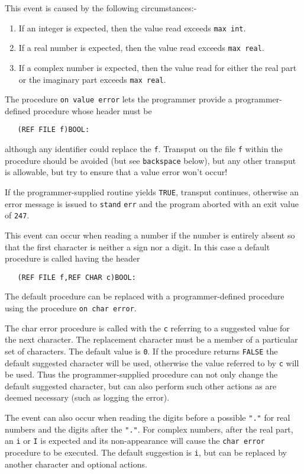 This event is caused by the following circumstances:-
\begin{enumerate}
\item If an integer is expected, then the value read exceeds
\verb|max int|.
\item If a real number is expected, then the value read exceeds
\verb|max real|.
\item If a complex number is expected, then the value read for either
the real part or the imaginary part exceeds \verb|max real|.
\end{enumerate}
The procedure \verb|on value error| lets the programmer provide
a programmer-defined procedure whose header must be
\begin{verbatim}
   (REF FILE f)BOOL:
\end{verbatim}
\noindent
although any identifier could replace the \verb|f|. Transput on the
file \verb|f| within the procedure should be avoided (but see
\verb|backspace| below), but any other transput is allowable, but try
to ensure that a value error won't occur!

If the programmer-supplied routine yields \verb|TRUE|, transput
continues, otherwise an error message is issued to \verb|stand|
\verb|err| and the program aborted with an exit value of \verb|247|.

This event can occur when reading a number if the number is entirely
absent so that the first character is neither a sign nor a digit. In
this case a default procedure is called having the header
\begin{verbatim}
   (REF FILE f,REF CHAR c)BOOL:
\end{verbatim}
\noindent
The default procedure can be replaced with a programmer-defined
procedure using the procedure \verb|on char error|.

The char error procedure is called with the \verb|c| referring to a
suggested value for the next character. The replacement character
must be a member of a particular set of characters. The default value
is \verb|0|. If the procedure returns \verb|FALSE| the default
suggested character will be used, otherwise the value referred to by
\verb|c| will be used. Thus the programmer-supplied procedure can not
only change the default suggested character, but can also perform
such other actions as are deemed necessary (such as logging the
error).

The event can also occur when reading the digits before a possible
\verb|"."| for real numbers and the digits after the \verb|"."|. For
complex numbers, after the real part, an \verb|i| or \verb|I| is
expected and its non-appearance will cause the \verb|char error|
procedure to be executed. The default suggestion is \verb|i|, but can
be replaced by another character and optional actions.

